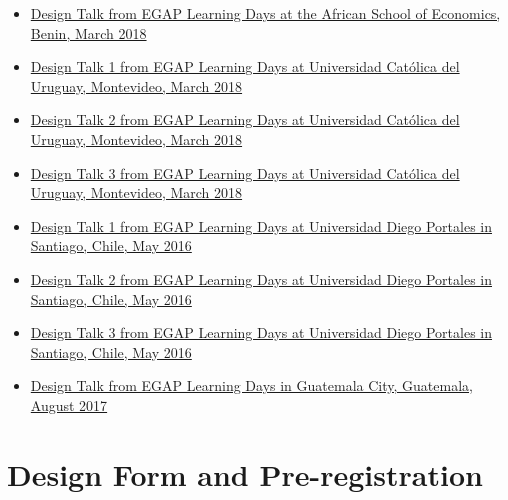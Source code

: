 \documentclass[12pt,]{book}
\begin{document}
\begin{itemize}
\item
  \href{https://egap.github.io/learningdays-resources/Slides/Examples/research_design_2-benin.pdf}{Design Talk from EGAP Learning Days at the African School of Economics, Benin, March 2018}
\item
  \href{https://egap.github.io/learningdays-resources/Slides/Examples/research_design_1-montevideo.pdf}{Design Talk 1 from EGAP Learning Days at Universidad Católica del Uruguay, Montevideo, March 2018}
\item
  \href{https://egap.github.io/learningdays-resources/Slides/Examples/research_design_2-montevideo.pdf}{Design Talk 2 from EGAP Learning Days at Universidad Católica del Uruguay, Montevideo, March 2018}
\item
  \href{https://egap.github.io/learningdays-resources/Slides/Examples/research_design_3-montevideo.pdf}{Design Talk 3 from EGAP Learning Days at Universidad Católica del Uruguay, Montevideo, March 2018}
\item
  \href{https://egap.github.io/learningdays-resources/Slides/Examples/research_design_1-santiago.pdf}{Design Talk 1 from EGAP Learning Days at Universidad Diego Portales in Santiago, Chile, May 2016}
\item
  \href{https://egap.github.io/learningdays-resources/Slides/Examples/research_design_2-santiago.pdf}{Design Talk 2 from EGAP Learning Days at Universidad Diego Portales in Santiago, Chile, May 2016}
\item
  \href{https://egap.github.io/learningdays-resources/Slides/Examples/research_design_3-santiago.pdf}{Design Talk 3 from EGAP Learning Days at Universidad Diego Portales in Santiago, Chile, May 2016}
\item
  \href{https://egap.github.io/learningdays-resources/Slides/Examples/research_design-guatemala.pdf}{Design Talk from EGAP Learning Days in Guatemala City, Guatemala, August 2017}
\end{itemize}

\hypertarget{design-form-and-pre-registration}{%
\section{Design Form and Pre-registration}\label{design-form-and-pre-registration}}
\end{document}
